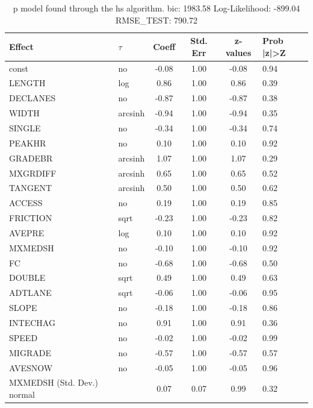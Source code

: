 \begin{table}
	\caption{p model found through the hs algorithm. bic: 1983.58 Log-Likelihood: -899.04 RMSE_TEST: 790.72}
	\begin{center}
		\begin{tabular}{|l|l|c|c|c|l|}
			\hline
			Effect & $\tau$ & Coeff & Std. Err & z-values & Prob |z|>Z \\
			\hline
			const & no & -0.08 & 1.00 & -0.08 & 0.94 \\
			\hline
			LENGTH & log & 0.86 & 1.00 & 0.86 & 0.39 \\
			\hline
			DECLANES & no & -0.87 & 1.00 & -0.87 & 0.38 \\
			\hline
			WIDTH & arcsinh & -0.94 & 1.00 & -0.94 & 0.35 \\
			\hline
			SINGLE & no & -0.34 & 1.00 & -0.34 & 0.74 \\
			\hline
			PEAKHR & no & 0.10 & 1.00 & 0.10 & 0.92 \\
			\hline
			GRADEBR & arcsinh & 1.07 & 1.00 & 1.07 & 0.29 \\
			\hline
			MXGRDIFF & arcsinh & 0.65 & 1.00 & 0.65 & 0.52 \\
			\hline
			TANGENT & arcsinh & 0.50 & 1.00 & 0.50 & 0.62 \\
			\hline
			ACCESS & no & 0.19 & 1.00 & 0.19 & 0.85 \\
			\hline
			FRICTION & sqrt & -0.23 & 1.00 & -0.23 & 0.82 \\
			\hline
			AVEPRE & log & 0.10 & 1.00 & 0.10 & 0.92 \\
			\hline
			MXMEDSH & no & -0.10 & 1.00 & -0.10 & 0.92 \\
			\hline
			FC & no & -0.68 & 1.00 & -0.68 & 0.50 \\
			\hline
			DOUBLE & sqrt & 0.49 & 1.00 & 0.49 & 0.63 \\
			\hline
			ADTLANE & sqrt & -0.06 & 1.00 & -0.06 & 0.95 \\
			\hline
			SLOPE & no & -0.18 & 1.00 & -0.18 & 0.86 \\
			\hline
			INTECHAG & no & 0.91 & 1.00 & 0.91 & 0.36 \\
			\hline
			SPEED & no & -0.02 & 1.00 & -0.02 & 0.99 \\
			\hline
			MIGRADE & no & -0.57 & 1.00 & -0.57 & 0.57 \\
			\hline
			AVESNOW & no & -0.05 & 1.00 & -0.05 & 0.96 \\
			\hline
			MXMEDSH (Std. Dev.) normal &  & 0.07 & 0.07 & 0.99 & 0.32 \\
			\hline

\end{tabular}
\end{center}
\end{table}
